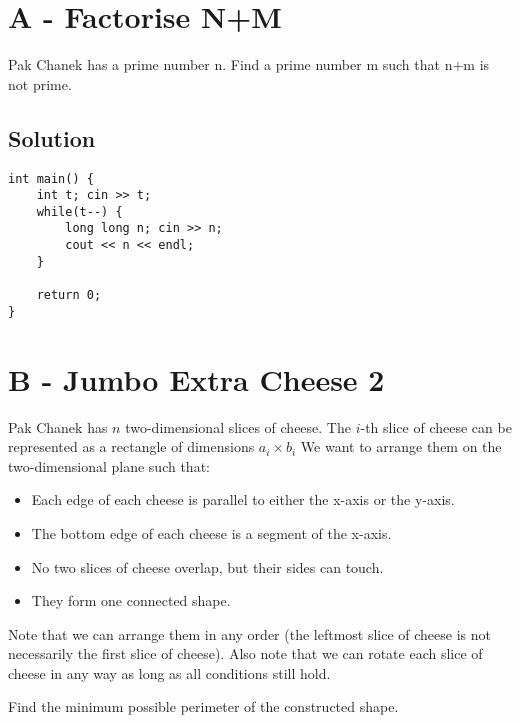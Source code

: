 \section{A - Factorise N+M}
Pak Chanek has a prime number n. Find a prime number m such that n+m is not prime.

\subsection{Solution}

\begin{lstlisting}
int main() {
	int t; cin >> t;
	while(t--) {
		long long n; cin >> n;
		cout << n << endl;
	}

	return 0;
}
\end{lstlisting}

\section{B - Jumbo Extra Cheese 2}
Pak Chanek has $n$ two-dimensional slices of cheese. 
The $i$-th slice of cheese can be represented as a rectangle of dimensions 
$a_i \times b_i$
We want to arrange them on the two-dimensional plane such that:
\begin{itemize}
	\item Each edge of each cheese is parallel to either the x-axis or the
		y-axis.
	\item The bottom edge of each cheese is a segment of the x-axis.
	\item No two slices of cheese overlap, but their sides can touch.
	\item They form one connected shape.
\end{itemize}
Note that we can arrange them in any order (the leftmost slice of cheese is not necessarily the first slice of cheese). Also note that we can rotate each slice of cheese in any way as long as all conditions still hold.

Find the minimum possible perimeter of the constructed shape.
